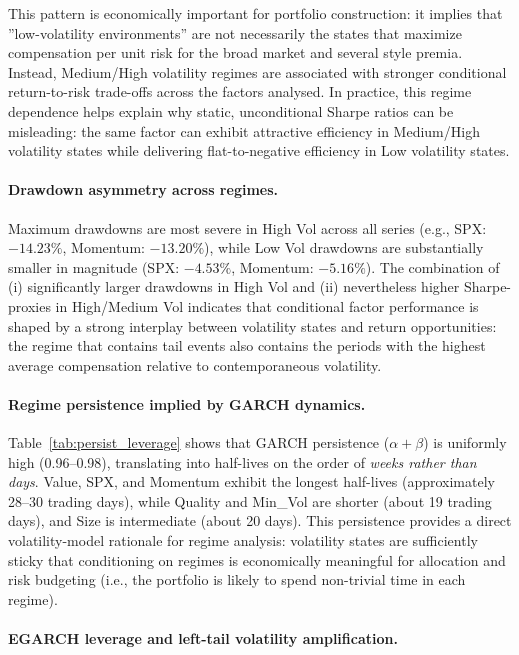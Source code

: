 \documentclass{article}
\begin{document}
This pattern is economically important for portfolio construction: it implies that ''low-volatility environments'' are not necessarily the states that maximize compensation per unit risk for the broad market and several style premia. Instead, Medium/High volatility regimes are associated with stronger conditional return-to-risk trade-offs across the factors analysed. In practice, this regime dependence helps explain why static, unconditional Sharpe ratios can be misleading: the same factor can exhibit attractive efficiency in Medium/High volatility states while delivering flat-to-negative efficiency in Low volatility states.

\paragraph{Drawdown asymmetry across regimes.}

Maximum drawdowns are most severe in High Vol across all series (e.g., SPX: $-14.23\%$, Momentum: $-13.20\%$), while Low Vol drawdowns are substantially smaller in magnitude (SPX: $-4.53\%$, Momentum: $-5.16\%$). The combination of (i) significantly larger drawdowns in High Vol and (ii) nevertheless higher Sharpe-proxies in High/Medium Vol indicates that conditional factor performance is shaped by a strong interplay between volatility states and return opportunities: the regime that contains tail events also contains the periods with the highest average compensation relative to contemporaneous volatility.

\paragraph{Regime persistence implied by GARCH dynamics.}

Table~\ref{tab:persist_leverage} shows that GARCH persistence ($\alpha+\beta$) is uniformly high (0.96--0.98), translating into half-lives on the order of \emph{weeks rather than days}. Value, SPX, and Momentum exhibit the longest half-lives (approximately 28--30 trading days), while Quality and Min\_Vol are shorter (about 19 trading days), and Size is intermediate (about 20 days). This persistence provides a direct volatility-model rationale for regime analysis: volatility states are sufficiently sticky that conditioning on regimes is economically meaningful for allocation and risk budgeting (i.e., the portfolio is likely to spend non-trivial time in each regime).

\paragraph{EGARCH leverage and left-tail volatility amplification.}
\end{document}
